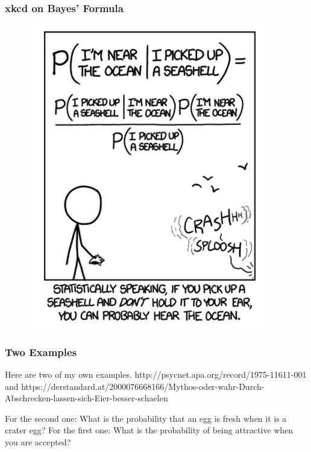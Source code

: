 \documentclass[xcolor=dvipsnames]{beamer}
\begin{document}
\begin{frame}
  \frametitle{xkcd on Bayes' Formula}
\begin{figure}[h]
\includegraphics[scale=.5]{./diagrams/xkcd_bayes1.png}
\end{figure}
\end{frame}

\begin{frame}
  \frametitle{Two Examples}
Here are two of my own examples.
http://psycnet.apa.org/record/1975-11611-001 and
https://derstandard.at/2000076668166/Mythos-oder-wahr-Durch-Abschrecken-lassen-sich-Eier-besser-schaelen

For the second one: What is the probability that an egg is fresh when
it is a crater egg? For the first one: What is the probability of
being attractive when you are accepted?
\end{frame}
\end{document}

